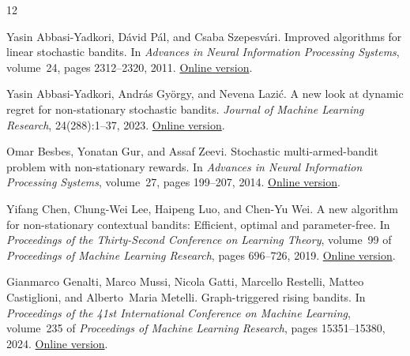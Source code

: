 \documentclass[11pt]{article}
\theoremstyle{remark}
\begin{document}
{\small\raggedright
\setlength{\bibsep}{3pt}
\begin{thebibliography}{12}

Yasin Abbasi-Yadkori, D\'avid P\'al, and Csaba Szepesv\'ari.
\newblock Improved algorithms for linear stochastic bandits.
\newblock In \emph{Advances in Neural Information Processing Systems},
volume~24, pages 2312--2320, 2011.
\newblock \href{https://proceedings.neurips.cc/paper/2011/hash/e1d5be1c7f2f456670de3d53c7b54f4a-Abstract.html}{Online version}.

Yasin Abbasi-Yadkori, Andr\'as Gy\"orgy, and Nevena Lazi\'c.
\newblock A new look at dynamic regret for non-stationary stochastic bandits.
\newblock \emph{Journal of Machine Learning Research}, 24(288):1--37, 2023.
\newblock \href{https://www.jmlr.org/papers/v24/22-0387.html}{Online version}.

Omar Besbes, Yonatan Gur, and Assaf Zeevi.
\newblock Stochastic multi-armed-bandit problem with non-stationary rewards.
\newblock In \emph{Advances in Neural Information Processing Systems},
volume~27, pages 199--207, 2014.
\newblock \href{https://proceedings.neurips.cc/paper_files/paper/2014/hash/91ba7292e5388b90b58d0b839a7f19ec-Abstract.html}{Online version}.

Yifang Chen, Chung-Wei Lee, Haipeng Luo, and Chen-Yu Wei.
\newblock A new algorithm for non-stationary contextual bandits: Efficient,
optimal and parameter-free.
\newblock In \emph{Proceedings of the Thirty-Second Conference on Learning
Theory}, volume~99 of \emph{Proceedings of Machine Learning Research}, pages
696--726, 2019.
\newblock \href{https://proceedings.mlr.press/v99/chen19b.html}{Online version}.

Gianmarco Genalti, Marco Mussi, Nicola Gatti, Marcello Restelli,
Matteo Castiglioni, and Alberto~Maria Metelli.
\newblock Graph-triggered rising bandits.
\newblock In \emph{Proceedings of the 41st International Conference on Machine
Learning}, volume~235 of \emph{Proceedings of Machine Learning Research},
pages 15351--15380, 2024.
\newblock \href{https://proceedings.mlr.press/v235/genalti24a.html}{Online version}.


\end{thebibliography}}
\end{document}
